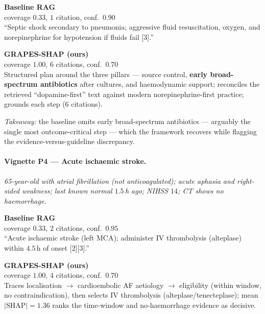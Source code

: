 \documentclass[11pt,a4paper]{report}
\begin{document}
\noindent
\begin{minipage}[t]{0.47\textwidth}
\footnotesize
\textbf{Baseline RAG}\\{\scriptsize coverage $0.33$, $1$ citation, conf.\ $0.90$}\\[3pt]
``Septic shock secondary to pneumonia; aggressive fluid resuscitation, oxygen,
and norepinephrine for hypotension if fluids fail [3].''
\end{minipage}\hfill
\begin{minipage}[t]{0.47\textwidth}
\footnotesize
\textbf{GRAPES-SHAP (ours)}\\{\scriptsize coverage $1.00$, $6$ citations, conf.\ $0.70$}\\[3pt]
Structured plan around the three pillars --- source control, \textbf{early
broad-spectrum antibiotics} after cultures, and haemodynamic support;
reconciles the retrieved ``dopamine-first'' text against modern
norepinephrine-first practice; grounds each step ($6$ citations).
\end{minipage}

\smallskip
\noindent\textit{Takeaway:} the baseline omits early broad-spectrum antibiotics
--- arguably the single most outcome-critical step --- which the framework
recovers while flagging the evidence-versus-guideline discrepancy.

\paragraph{Vignette P4 --- Acute ischaemic stroke.}
\emph{65-year-old with atrial fibrillation (not anticoagulated); acute aphasia
and right-sided weakness; last known normal $1.5$\,h ago; NIHSS $14$; CT shows
no haemorrhage.}

\noindent
\begin{minipage}[t]{0.47\textwidth}
\footnotesize
\textbf{Baseline RAG}\\{\scriptsize coverage $0.33$, $2$ citations, conf.\ $0.95$}\\[3pt]
``Acute ischaemic stroke (left MCA); administer IV thrombolysis (alteplase)
within $4.5$\,h of onset [2][3].''
\end{minipage}\hfill
\begin{minipage}[t]{0.47\textwidth}
\footnotesize
\textbf{GRAPES-SHAP (ours)}\\{\scriptsize coverage $1.00$, $4$ citations, conf.\ $0.70$}\\[3pt]
Traces localisation $\rightarrow$ cardioembolic AF aetiology $\rightarrow$
eligibility (within window, no contraindication), then selects IV thrombolysis
(alteplase/tenecteplase); mean$|\text{SHAP}|=1.36$ ranks the time-window and
no-haemorrhage evidence as decisive.
\end{minipage}
\end{document}
